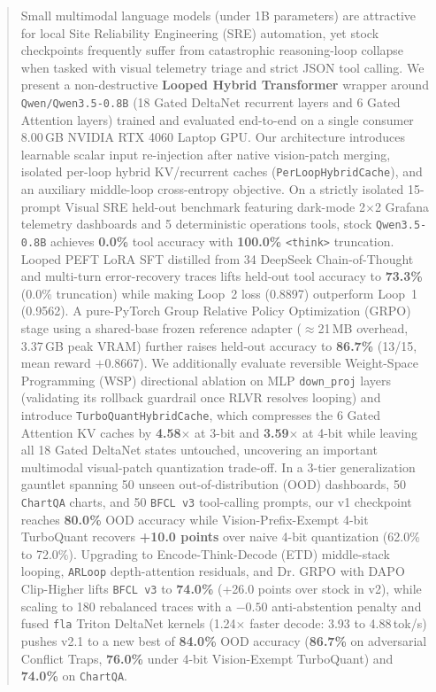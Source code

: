\documentclass[10pt,letterpaper]{article}
\begin{document}
\begin{abstract}
\noindent
Small multimodal language models (under 1B parameters) are attractive for local Site Reliability Engineering (SRE) automation, yet stock checkpoints frequently suffer from catastrophic reasoning-loop collapse when tasked with visual telemetry triage and strict JSON tool calling. We present a non-destructive \textbf{Looped Hybrid Transformer} wrapper around \texttt{Qwen/Qwen3.5-0.8B} (18 Gated DeltaNet recurrent layers and 6 Gated Attention layers) trained and evaluated end-to-end on a single consumer 8.00\,GB NVIDIA RTX 4060 Laptop GPU. Our architecture introduces learnable scalar input re-injection after native vision-patch merging, isolated per-loop hybrid KV/recurrent caches (\texttt{PerLoopHybridCache}), and an auxiliary middle-loop cross-entropy objective. On a strictly isolated 15-prompt Visual SRE held-out benchmark featuring dark-mode 2$\times$2 Grafana telemetry dashboards and 5 deterministic operations tools, stock \texttt{Qwen3.5-0.8B} achieves \textbf{0.0\%} tool accuracy with \textbf{100.0\%} \texttt{<think>} truncation. Looped PEFT LoRA SFT distilled from 34 DeepSeek Chain-of-Thought and multi-turn error-recovery traces lifts held-out tool accuracy to \textbf{73.3\%} (0.0\% truncation) while making Loop~2 loss (0.8897) outperform Loop~1 (0.9562). A pure-PyTorch Group Relative Policy Optimization (GRPO) stage using a shared-base frozen reference adapter ($\approx$21\,MB overhead, 3.37\,GB peak VRAM) further raises held-out accuracy to \textbf{86.7\%} (13/15, mean reward $+0.8667$). We additionally evaluate reversible Weight-Space Programming (WSP) directional ablation on MLP \texttt{down\_proj} layers (validating its rollback guardrail once RLVR resolves looping) and introduce \texttt{TurboQuantHybridCache}, which compresses the 6 Gated Attention KV caches by \textbf{4.58$\times$} at 3-bit and \textbf{3.59$\times$} at 4-bit while leaving all 18 Gated DeltaNet states untouched, uncovering an important multimodal visual-patch quantization trade-off. In a 3-tier generalization gauntlet spanning 50 unseen out-of-distribution (OOD) dashboards, 50 \texttt{ChartQA} charts, and 50 \texttt{BFCL v3} tool-calling prompts, our v1 checkpoint reaches \textbf{80.0\%} OOD accuracy while Vision-Prefix-Exempt 4-bit TurboQuant recovers \textbf{+10.0 points} over naive 4-bit quantization (62.0\% to 72.0\%). Upgrading to Encode-Think-Decode (ETD) middle-stack looping, \texttt{ARLoop} depth-attention residuals, and Dr. GRPO with DAPO Clip-Higher lifts \texttt{BFCL v3} to \textbf{74.0\%} (+26.0 points over stock in v2), while scaling to 180 rebalanced traces with a $-0.50$ anti-abstention penalty and fused \texttt{fla} Triton DeltaNet kernels (1.24$\times$ faster decode: 3.93 to 4.88\,tok/s) pushes v2.1 to a new best of \textbf{84.0\%} OOD accuracy (\textbf{86.7\%} on adversarial Conflict Traps, \textbf{76.0\%} under 4-bit Vision-Exempt TurboQuant) and \textbf{74.0\%} on \texttt{ChartQA}.
\end{abstract}
\end{document}
